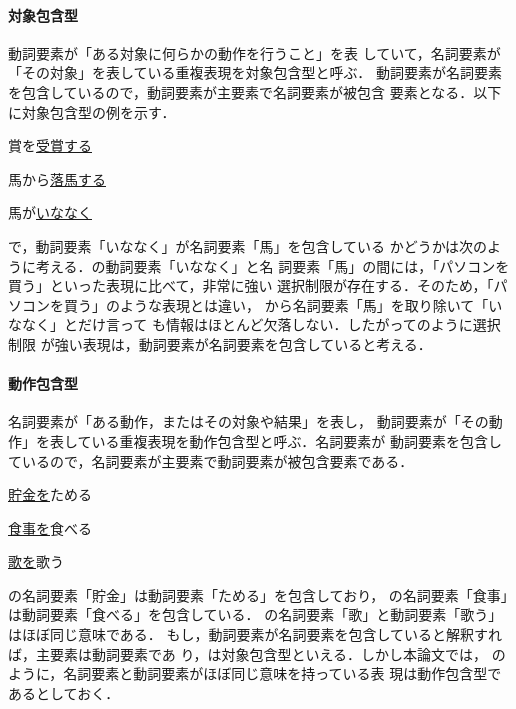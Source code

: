 \documentclass{nlp}
\begin{document}
\paragraph{対象包含型}動詞要素が「ある対象に何らかの動作を行うこと」を表
していて，名詞要素が「その対象」を表している重複表現を対象包含型と呼ぶ．
動詞要素が名詞要素を包含しているので，動詞要素が主要素で名詞要素が被包含
要素となる．以下に対象包含型の例を示す．
\begin{EXAMPLE}
 \item 賞を\underline{受賞する}   
 \item 馬から\underline{落馬する} 
 \item 馬が\underline{いななく}   
\end{EXAMPLE}
で，動詞要素「いななく」が名詞要素「馬」を包含している
かどうかは次のように考える．の動詞要素「いななく」と名
詞要素「馬」の間には，「パソコンを買う」といった表現に比べて，非常に強い
選択制限が存在する．そのため，「パソコンを買う」のような表現とは違い，
から名詞要素「馬」を取り除いて「いななく」とだけ言って
も情報はほとんど欠落しない．したがってのように選択制限
が強い表現は，動詞要素が名詞要素を包含していると考える．


\paragraph{動作包含型}名詞要素が「ある動作，またはその対象や結果」を表し，
動詞要素が「その動作」を表している重複表現を動作包含型と呼ぶ．名詞要素が
動詞要素を包含しているので，名詞要素が主要素で動詞要素が被包含要素である．
\begin{EXAMPLE}
 \item \underline{貯金を}ためる 
 \item \underline{食事を}食べる 
 \item \underline{歌を}歌う     
\end{EXAMPLE}
の名詞要素「貯金」は動詞要素「ためる」を包含しており，
の名詞要素「食事」は動詞要素「食べる」を包含している．
の名詞要素「歌」と動詞要素「歌う」はほぼ同じ意味である．
もし，動詞要素が名詞要素を包含していると解釈すれば，主要素は動詞要素であ
り，は対象包含型といえる．しかし本論文では，
のように，名詞要素と動詞要素がほぼ同じ意味を持っている表
現は動作包含型であるとしておく．
\end{document}
